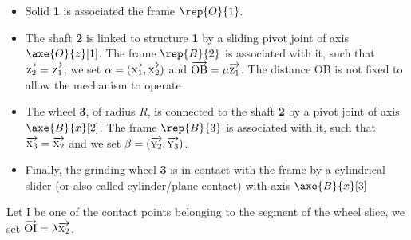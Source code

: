 \documentclass[11pt,a4paper,twoside]{article} %
\begin{document}
\begin{itemize}
    \setlength\itemsep{0.1em}
    \item {}
          {Solid \textbf{1} is associated the frame $\rep{O}{1}$.}
    \item {}
          {The shaft \textbf{2} is linked to structure \textbf{1} by a sliding pivot joint
          of axis $\axe{O}{z}[1]$. The frame $\rep{B}{2}$ is associated with it,
          such that $\protect\overrightarrow{\textsc{z}_{2}}=\protect\overrightarrow{\textsc{z}_{1}}$; we set $\alpha= (\protect\overrightarrow{\textsc{x}_{1}},\protect\overrightarrow{\textsc{x}_{2}})$ and $\overrightarrow{\mathrm{OB}}=\mu \protect\overrightarrow{\textsc{z}_{1}}$.
          The distance OB is not fixed to allow the mechanism to operate}
   \item {}
          {The wheel \textbf{3}, of radius $R$, is connected to the shaft \textbf{2} by a pivot
          joint of axis $\axe{B}{x}[2]$. The frame $\rep{B}{3}$ is associated with it,
          such that $\protect\overrightarrow{\textsc{x}_{3}}=\protect\overrightarrow{\textsc{x}_{2}}$ and we set $\beta= (\protect\overrightarrow{\textsc{y}_{2}},\protect\overrightarrow{\textsc{y}_{3}})$.}
   \item {}
          {Finally, the grinding wheel \textbf{3} is in contact with the frame by a 
          cylindrical slider (or also called cylinder/plane contact) with axis $\axe{B}{x}[3]$}
\end{itemize}
   {Let I be one of the contact points belonging to the segment of the wheel slice, we set $\overrightarrow{\mathrm{OI}}=\lambda\protect\overrightarrow{\textsc{x}_{2}}$.}
\end{document}
